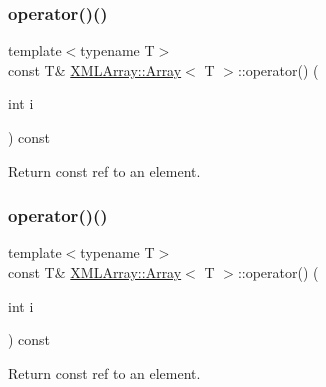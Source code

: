 \subsubsection{\texorpdfstring{operator()()}{operator()()}\hspace{0.1cm}{\footnotesize\ttfamily [3/4]}}
{\footnotesize\ttfamily template$<$typename T$>$ \\
const T\& \mbox{\hyperlink{classXMLArray_1_1Array}{X\+M\+L\+Array\+::\+Array}}$<$ T $>$\+::operator() (\begin{DoxyParamCaption}\item[{int}]{i }\end{DoxyParamCaption}) const\hspace{0.3cm}{\ttfamily [inline]}}



Return const ref to an element. 

\mbox{\label{classXMLArray_1_1Array_a6935c8d1efcf82e7c751717a94e7c145}} 
\subsubsection{\texorpdfstring{operator()()}{operator()()}\hspace{0.1cm}{\footnotesize\ttfamily [4/4]}}
{\footnotesize\ttfamily template$<$typename T$>$ \\
const T\& \mbox{\hyperlink{classXMLArray_1_1Array}{X\+M\+L\+Array\+::\+Array}}$<$ T $>$\+::operator() (\begin{DoxyParamCaption}\item[{int}]{i }\end{DoxyParamCaption}) const\hspace{0.3cm}{\ttfamily [inline]}}



Return const ref to an element. 

\mbox{\label{classXMLArray_1_1Array_a866bd17aae2f3d1935f015a936ce9424}} 
